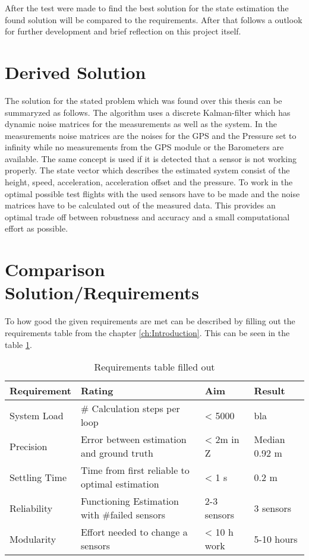 After the test were made to find the best solution for the state estimation
the found solution will be compared to the requirements.
After that follows a outlook for further development and brief reflection on this project itself.

\section{Derived Solution}
The solution for the stated problem which was found over this thesis can be summaryzed as follows.
The algorithm uses a discrete Kalman-filter which has dynamic noise matrices for the measurements as well as the system.
In the measurements noise matrices are the noises for the GPS and the Pressure set to infinity while no measurements from the GPS module or the Barometers are available.
The same concept is used if it is detected that a sensor is not working properly.
The state vector which describes the estimated system consist of the height, speed, acceleration, acceleration offset and the pressure.
To work in the optimal possible test flights with the used sensors have to be made and the noise matrices have to be calculated out of the measured data.
This provides an optimal trade off between robustness and accuracy and a small computational effort as possible.

\section{Comparison Solution/Requirements}
To how good the given requirements are met can be described by filling out the requirements table from the chapter \ref{ch:Introduction}.
This can be seen in the table \ref{tab:RequirementsFilledOut}.

 \begin{table}[h]
 \centering
 \begin{tabular}{|l|l|l|l|}	
 \hline	
 \bf{Requirement}   & \bf{Rating} & \bf{Aim} & \bf{Result} \\ \hline
 System Load   & \# Calculation steps per loop & < 5000 & bla \\ \hline
 Precision     & Error between estimation and ground truth  & < 2m in Z & Median 0.92 m  \\ \hline
 Settling Time & Time from first reliable to optimal estimation  & < 1 s &  0.2 m \\ \hline
 Reliability   & Functioning Estimation with \#failed sensors & 2-3 sensors & 3 sensors \\ \hline	
 Modularity    & Effort needed to change a sensors & < 10 h work &  5-10 hours \\ \hline
 \end{tabular}	
 \caption{Requirements table filled out}
 \label{tab:RequirementsFilledOut}
 \end{table}
 
